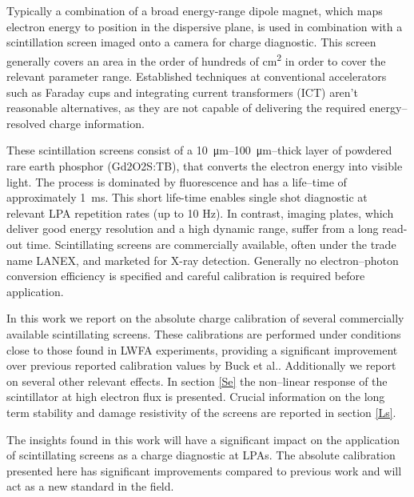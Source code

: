 \documentclass[%
preprint,
amsmath,
amssymb,
aip,
rsi, 
numerical,
floatfix,
]{revtex4-1}
\newcommand{\myCite}[1]{\textcolor{blue}{\cite{#1}}}
\begin{document}
Typically a combination of a broad energy-range dipole magnet, which maps electron energy to position in the dispersive plane, is used in combination with a scintillation screen imaged onto a camera for charge diagnostic. 
This screen generally covers an area in the order of hundreds of \si{\centi\metre^2} in order to cover the relevant parameter range. 
Established techniques at conventional accelerators such as Faraday cups and integrating current transformers (ICT) aren't reasonable alternatives, as they are not capable of delivering the required energy--resolved charge information.

These scintillation screens consist of a \SIrange{10}{100}{\micro\meter}--thick layer of powdered rare earth phosphor (Gd2O2S:TB), that converts the electron energy into visible light. 
The process is dominated by fluorescence and has a life--time of approximately \SI{1}{\milli\second}. 
This short life-time enables single shot diagnostic at relevant LPA repetition rates (up to 10 Hz). 
In contrast, imaging plates, which deliver good energy resolution and a high dynamic range\myCite{Tanaka2005,Masuda2008,Zeil2010,Bonnet2013}, suffer from a long read-out time.
Scintillating screens are commercially available, often under the trade name LANEX, and marketed for X-ray detection. 
Generally no electron--photon conversion efficiency is specified and careful calibration is required before application.

In this work we report on the absolute charge calibration of several commercially available scintillating screens. 
These calibrations are performed under conditions close to those found in LWFA experiments, providing a significant improvement over previous reported calibration values by Buck et al.\myCite{Buck2010}.
Additionally we report on several other relevant effects. 
In section \ref{Se} the non--linear response of the scintillator at high electron flux is presented. 
Crucial information on the long term stability and damage resistivity of the screens are reported in section \ref{Ls}.

The insights found in this work will have a significant impact on the application of scintillating screens as a charge diagnostic at LPAs. 
The absolute calibration presented here has significant improvements compared to previous work and  will act as a new standard in the field.  
\end{document}
